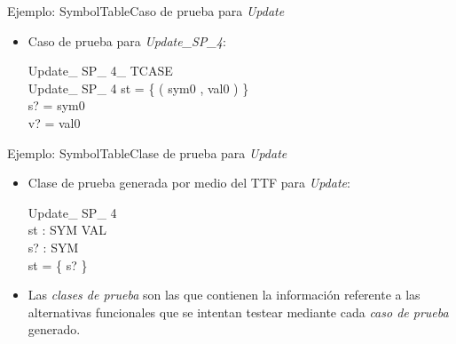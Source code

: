 \documentclass{beamer}
\begin{document}
\begin{frame}{Ejemplo: SymbolTable}{Caso de prueba para \emph{Update}}
	\begin{itemize}
	\vspace{-.5cm}
        \item{
                Caso de prueba para \emph{Update\_SP\_4}:\\
		\vspace{-.5cm}
		\begin{schema}{Update\_ SP\_ 4\_ TCASE}\\
			Update\_ SP\_ 4 
			\where
			st = \{ ( sym0 , val0 ) \} \\
			s? = sym0 \\
			v? = val0
		\end{schema}
	}
    \end{itemize}
\end{frame}

\begin{frame}{Ejemplo: SymbolTable}{Clase de prueba para \emph{Update}}
	\begin{itemize}
        \item{
                Clase de prueba generada por medio del TTF para \emph{Update}:\\
		\vspace{-.5cm}
		\begin{schema}{Update\_ SP\_ 4}\\
			st : SYM \pfun VAL \\
			s? : SYM \\
			\where
			\dom st = \{ s? \}
		\end{schema}
        }

	\item{
		Las \emph{clases de prueba} son las que contienen la información referente a las alternativas funcionales que se intentan testear mediante cada \emph{caso de prueba} generado.
	}
	
	\end{itemize}
\end{frame}
\end{document}
